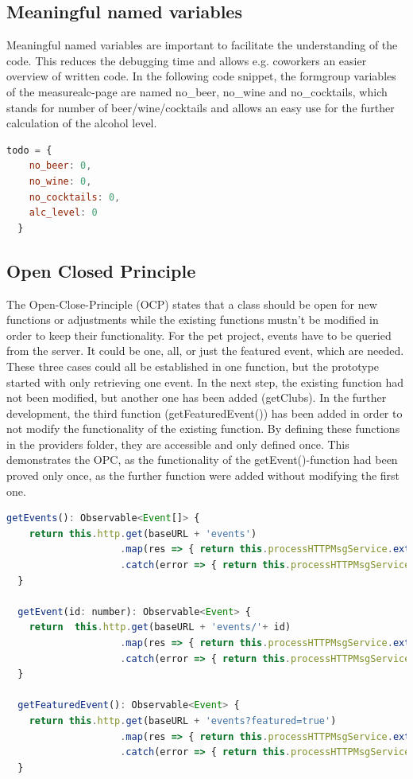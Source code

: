 \documentclass[12pt]{article}
\begin{document}
\subsection{Meaningful named variables}
Meaningful named variables are important to facilitate the understanding of the code. This reduces the debugging time and allows e.g. coworkers an easier overview of written code. In the following code snippet, the formgroup variables of the measurealc-page are named no\_beer, no\_wine and no\_cocktails, which stands for number of beer/wine/cocktails and allows an easy use for the further calculation of the alcohol level.

\begin{lstlisting}[language=javascript]
todo = {
    no_beer: 0,
    no_wine: 0,
    no_cocktails: 0,
    alc_level: 0
  }
\end{lstlisting}

\subsection{Open Closed Principle}

The Open-Close-Principle (OCP) states that a class should be open for new functions or adjustments while the existing functions mustn't be modified in order to keep their functionality. For the pet project, events have to be queried from the server. It could be one, all, or just the featured event, which are needed. These three cases could all be established in one function, but the prototype started with only retrieving one event. In the next step, the existing function had not been modified, but another one has been added (getClubs). In the further development, the third function (getFeaturedEvent()) has been added in order to not modify the functionality of the existing function. By defining these functions in the providers folder, they are accessible and only defined once. This demonstrates the OPC, as the functionality of the getEvent()-function had been proved only once, as the further function were added without modifying the first one.
\begin{lstlisting}[language=javascript]
getEvents(): Observable<Event[]> {
    return this.http.get(baseURL + 'events')
                    .map(res => { return this.processHTTPMsgService.extractData(res); })
                    .catch(error => { return this.processHTTPMsgService.handleError(error); });
  }

  getEvent(id: number): Observable<Event> {
    return  this.http.get(baseURL + 'events/'+ id)
                    .map(res => { return this.processHTTPMsgService.extractData(res); })
                    .catch(error => { return this.processHTTPMsgService.handleError(error); });
  }

  getFeaturedEvent(): Observable<Event> {
    return this.http.get(baseURL + 'events?featured=true')
                    .map(res => { return this.processHTTPMsgService.extractData(res)[0]; })
                    .catch(error => { return this.processHTTPMsgService.handleError(error); });
  }
\end{lstlisting}
\end{document}
